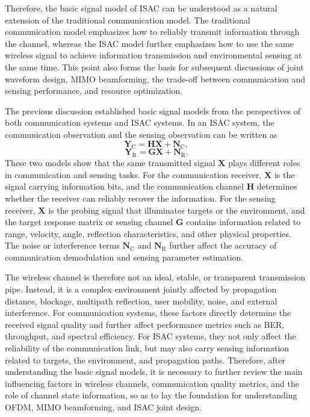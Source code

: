 Therefore,
the basic signal model of ISAC can be understood as a natural extension
of the traditional communication model.
The traditional communication model emphasizes how to reliably transmit information through the channel,
whereas the ISAC model further emphasizes how to use the same wireless signal
to achieve information transmission and environmental sensing at the same time.
This point also forms the basis for subsequent discussions of joint waveform design,
MIMO beamforming,
the trade-off between communication and sensing performance,
and resource optimization.



The previous discussion established basic signal models from the perspectives of both communication systems
and ISAC systems.
In an ISAC system,
the communication observation and the sensing observation can be written as
\[
    \mathbf{Y}_{\mathrm{C}}
    =
    \mathbf{H}\mathbf{X}
    +
    \mathbf{N}_{\mathrm{C}},
\]
\[
    \mathbf{Y}_{\mathrm{R}}
    =
    \mathbf{G}\mathbf{X}
    +
    \mathbf{N}_{\mathrm{R}}.
\]
These two models show that the same transmitted signal \(\mathbf{X}\)
plays different roles in communication and sensing tasks.
For the communication receiver,
\(\mathbf{X}\) is the signal carrying information bits,
and the communication channel \(\mathbf{H}\) determines whether the receiver can reliably recover the information.
For the sensing receiver,
\(\mathbf{X}\) is the probing signal that illuminates targets or the environment,
and the target response matrix or sensing channel \(\mathbf{G}\)
contains information related to range,
velocity,
angle,
reflection characteristics,
and other physical properties.
The noise or interference terms \(\mathbf{N}_{\mathrm{C}}\) and \(\mathbf{N}_{\mathrm{R}}\)
further affect the accuracy of communication demodulation and sensing parameter estimation.

The wireless channel is therefore not an ideal,
stable,
or transparent transmission pipe.
Instead,
it is a complex environment jointly affected by propagation distance,
blockage,
multipath reflection,
user mobility,
noise,
and external interference.
For communication systems,
these factors directly determine the received signal quality
and further affect performance metrics such as BER,
throughput,
and spectral efficiency.
For ISAC systems,
they not only affect the reliability of the communication link,
but may also carry sensing information related to targets,
the environment,
and propagation paths.
Therefore,
after understanding the basic signal models,
it is necessary to further review the main influencing factors in wireless channels,
communication quality metrics,
and the role of channel state information,
so as to lay the foundation for understanding OFDM,
MIMO beamforming,
and ISAC joint design.
 
